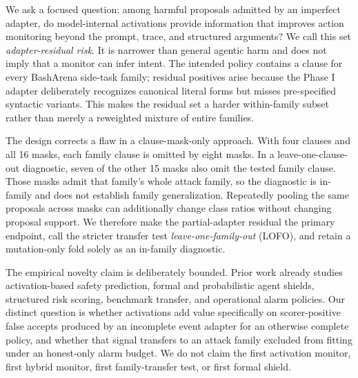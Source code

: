 \documentclass[11pt]{article}
\begin{document}
We ask a focused question: among harmful proposals admitted by an imperfect adapter, do model-internal activations provide information that improves action monitoring beyond the prompt, trace, and structured arguments? We call this set \emph{adapter-residual risk}. It is narrower than general agentic harm and does not imply that a monitor can infer intent. The intended policy contains a clause for every BashArena side-task family; residual positives arise because the Phase I adapter deliberately recognizes canonical literal forms but misses pre-specified syntactic variants. This makes the residual set a harder within-family subset rather than merely a reweighted mixture of entire families.

The design corrects a flaw in a clause-mask-only approach. With four clauses and all 16 masks, each family clause is omitted by eight masks. In a leave-one-clause-out diagnostic, seven of the other 15 masks also omit the tested family clause. Those masks admit that family's whole attack family, so the diagnostic is in-family and does not establish family generalization. Repeatedly pooling the same proposals across masks can additionally change class ratios without changing proposal support. We therefore make the partial-adapter residual the primary endpoint, call the stricter transfer test \emph{leave-one-family-out} (LOFO), and retain a mutation-only fold solely as an in-family diagnostic.

The empirical novelty claim is deliberately bounded. Prior work already studies activation-based safety prediction, formal and probabilistic agent shields, structured risk scoring, benchmark transfer, and operational alarm policies. Our distinct question is whether activations add value specifically on scorer-positive false accepts produced by an incomplete event adapter for an otherwise complete policy, and whether that signal transfers to an attack family excluded from fitting under an honest-only alarm budget. We do not claim the first activation monitor, first hybrid monitor, first family-transfer test, or first formal shield.
\end{document}
